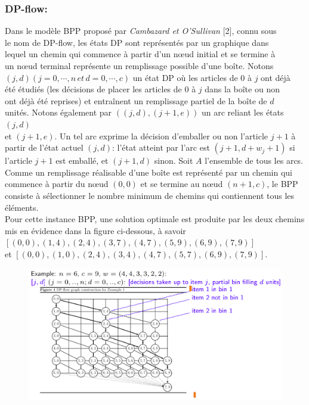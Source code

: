 \documentclass[class=report, crop=false]{standalone}
\begin{document}
        \subsubsection*{DP-flow:}
        Dans le modèle BPP proposé par \emph{Cambazard et O’Sullivan} [2], connu sous\\
        le nom de DP-flow, les états DP sont représentés par un graphique dans \\
        lequel un chemin qui commence à partir d'un nœud initial et se termine à \\ 
        un nœud terminal représente un remplissage possible d'une boîte. Notons \\
        \((j, d) (j = 0, \cdots, n \, et \, d = 0, \cdots, c)\) un état DP où les articles de \(0\) à \(j\) ont déjà \\
        été étudiés (les décisions de placer les articles de \(0\) à \(j\) dans la boîte ou non\\
        ont déjà été reprises) et entraînent un remplissage partiel de la boîte de \(d\) \\
        unités. Notons également par \(((j, d), (j + 1, e))\) un arc reliant les états \((j, d)\) \\
        et \((j + 1, e)\). Un tel arc exprime la décision d'emballer ou non l'article \(j + 1\) à partir de l'état actuel \((j, d)\): l'état atteint par l'arc est \((j + 1, d + w_j + 1)\) si l'article \(j + 1\) est emballé, et \((j + 1, d)\) sinon.
        Soit \(A\) l'ensemble de tous les arcs. Comme un remplissage réalisable d’une boîte est représenté par un chemin qui commence à partir du nœud \((0, 0)\) et se termine au nœud \((n + 1, c)\), le BPP consiste à sélectionner le nombre minimum de chemins qui contiennent tous les éléments. \\
        Pour cette instance BPP, une solution optimale est produite par les deux chemins mis en évidence dans la figure ci-dessous, à savoir \\\([(0,0), (1,4), (2,4), (3,7), (4,7), (5,9), (6,9), (7,9)]\) \\
        et \([(0,0), (1,0), (2,4), (3,4), (4,7), (5,7), (6,9), (7,9)]\).
        \begin{figure}[h!]
            \includegraphics[width=13.5cm]{../figures/DP-flow.png}
        \end{figure}
\end{document}
